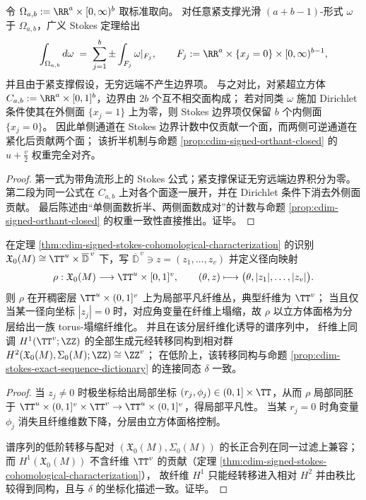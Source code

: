 

\begin{proposition}\label{prop:cdim-stokes-half-face-count}
令
\(
\Omega_{a,b}:=\RR^{a}\times[0,\infty)^{b}
\)
取标准取向。
对任意紧支撑光滑 \((a{+}b{-}1)\)-形式 \(\omega\) 于 \(\Omega_{a,b}\)，广义 Stokes 定理给出
\[
\int_{\Omega_{a,b}} d\omega
\;=\;
\sum_{j=1}^{b}\pm\int_{F_j}\omega|_{F_j},
\qquad
F_j:=\RR^{a}\times\{x_j=0\}\times[0,\infty)^{b-1},
\]
并且由于紧支撑假设，无穷远端不产生边界项。
与之对比，对紧超立方体 \(C_{a,b}:=\RR^{a}\times[0,1]^{b}\)，边界由 \(2b\) 个互不相交面构成；
若对同类 \(\omega\) 施加 Dirichlet 条件使其在外侧面 \(\{x_j=1\}\) 上为零，则 Stokes 边界项仅保留 \(b\) 个内侧面 \(\{x_j=0\}\)。
因此单侧通道在 Stokes 边界计数中仅贡献一个面，而两侧可逆通道在紧化后贡献两个面；
该折半机制与命题 \ref{prop:cdim-signed-orthant-closed} 的 \(u+\tfrac v2\) 权重完全对齐。
\end{proposition}
\begin{proof}
第一式为带角流形上的 Stokes 公式；紧支撑保证无穷远端边界积分为零。
第二段为同一公式在 \(C_{a,b}\) 上对各个面逐一展开，并在 Dirichlet 条件下消去外侧面贡献。
最后陈述由“单侧面数折半、两侧面数成对”的计数与命题 \ref{prop:cdim-signed-orthant-closed} 的权重一致性直接推出。证毕。
\end{proof}



\begin{proposition}\label{prop:cdim-stokes-radial-fibration-transgression}
在定理 \ref{thm:cdim-signed-stokes-cohomological-characterization} 的识别
\(
\mathfrak X_0(M)\cong \TT^{u}\times \overline{\mathbb D}^{\,v}
\)
下，写 \(\overline{\mathbb D}^{\,v}\ni z=(z_1,\dots,z_v)\) 并定义径向映射
\[
\rho:\mathfrak X_0(M)\longrightarrow \TT^{u}\times[0,1]^{v},
\qquad
(\theta,z)\longmapsto \bigl(\theta,|z_1|,\dots,|z_v|\bigr).
\]
则 \(\rho\) 在开稠密层 \(\TT^{u}\times(0,1]^{v}\) 上为局部平凡纤维丛，典型纤维为 \(\TT^{v}\)；
当且仅当某一径向坐标 \(|z_j|=0\) 时，对应角变量在纤维上塌缩，故 \(\rho\) 以立方体面格为分层给出一族 torus-塌缩纤维化。
并且在该分层纤维化诱导的谱序列中，
纤维上同调 \(H^{1}(\TT^{v};\ZZ)\) 的全部生成元经转移同构到相对群
\(
H^{2}(\mathfrak X_0(M),\Sigma_0(M);\ZZ)\cong \ZZ^{v}
\)；
在低阶上，该转移同构与命题 \ref{prop:cdim-stokes-exact-sequence-dictionary} 的连接同态 \(\delta\) 一致。
\end{proposition}
\begin{proof}
当 \(z_j\neq 0\) 时极坐标给出局部坐标 \((r_j,\phi_j)\in(0,1]\times\TT\)，从而 \(\rho\) 局部同胚于
\(
\TT^{u}\times(0,1]^{v}\times \TT^{v}\to \TT^{u}\times(0,1]^{v}
\)，得局部平凡性。
当某 \(r_j=0\) 时角变量 \(\phi_j\) 消失且纤维维数下降，分层由立方体面格控制。
\par
谱序列的低阶转移与配对 \((\mathfrak X_0(M),\Sigma_0(M))\) 的长正合列在同一过滤上兼容；
而 \(H^{1}(\mathfrak X_0(M))\) 不含纤维 \(\TT^{v}\) 的贡献（定理 \ref{thm:cdim-signed-stokes-cohomological-characterization}），
故纤维 \(H^{1}\) 只能经转移进入相对 \(H^{2}\) 并由秩比较得到同构，且与 \(\delta\) 的坐标化描述一致。证毕。
\end{proof}


